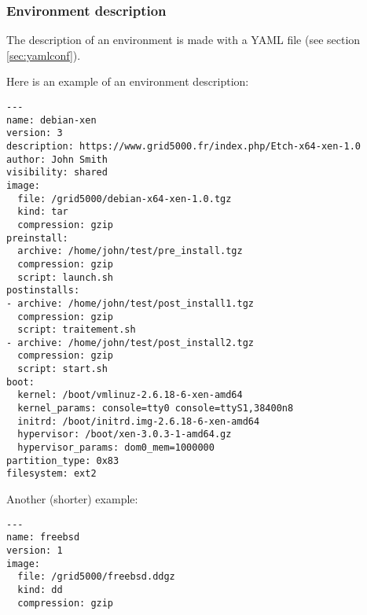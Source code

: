 \documentclass[a4wide,10pt,oneside]{book}
\begin{document}
\subsubsection{Environment description}\label{sec:env_desc}
The description of an environment is made with a YAML file (see section \ref{sec:yamlconf}).

Here is an example of an environment description:
\begin{small}
\begin{verbatim}
---
name: debian-xen
version: 3
description: https://www.grid5000.fr/index.php/Etch-x64-xen-1.0
author: John Smith
visibility: shared
image:
  file: /grid5000/debian-x64-xen-1.0.tgz
  kind: tar
  compression: gzip
preinstall:
  archive: /home/john/test/pre_install.tgz
  compression: gzip
  script: launch.sh
postinstalls:
- archive: /home/john/test/post_install1.tgz
  compression: gzip
  script: traitement.sh
- archive: /home/john/test/post_install2.tgz
  compression: gzip
  script: start.sh
boot:
  kernel: /boot/vmlinuz-2.6.18-6-xen-amd64
  kernel_params: console=tty0 console=ttyS1,38400n8
  initrd: /boot/initrd.img-2.6.18-6-xen-amd64
  hypervisor: /boot/xen-3.0.3-1-amd64.gz
  hypervisor_params: dom0_mem=1000000
partition_type: 0x83
filesystem: ext2
\end{verbatim}
\end{small}

Another (shorter) example:
\begin{small}
\begin{verbatim}
---
name: freebsd
version: 1
image:
  file: /grid5000/freebsd.ddgz
  kind: dd
  compression: gzip
\end{verbatim}
\end{small}
\end{document}
